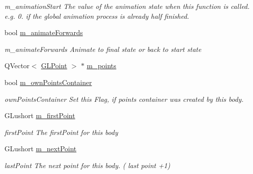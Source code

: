 \begin{DoxyCompactItemize}
\begin{DoxyCompactList}\small\item\em m\+\_\+animation\+Start The value of the animation state when this function is called. e.\+g. 0. if the global animation process is already half finished. \end{DoxyCompactList}\item 
\mbox{\label{class_g_l_body_ac3a56048c861a5bdd11b344e1e24946b}} 
bool \mbox{\hyperlink{class_g_l_body_ac3a56048c861a5bdd11b344e1e24946b}{m\+\_\+animate\+Forwards}}
\begin{DoxyCompactList}\small\item\em m\+\_\+animate\+Forwards Animate to final state or back to start state \end{DoxyCompactList}\item 
Q\+Vector$<$ \mbox{\hyperlink{class_g_l_point}{G\+L\+Point}} $>$ $\ast$ \mbox{\hyperlink{class_g_l_body_a8e157d4bf676d1c5af7f74d30d44ea12}{m\+\_\+points}}
\item 
\mbox{\label{class_g_l_body_afd41dccec396a5d5bc0d7deb004390c0}} 
bool \mbox{\hyperlink{class_g_l_body_afd41dccec396a5d5bc0d7deb004390c0}{m\+\_\+own\+Points\+Container}}
\begin{DoxyCompactList}\small\item\em own\+Points\+Container Set this Flag, if points container was created by this body. \end{DoxyCompactList}\item 
\mbox{\label{class_g_l_body_abaf51ac1970735fdc27e861e0276d059}} 
G\+Lushort \mbox{\hyperlink{class_g_l_body_abaf51ac1970735fdc27e861e0276d059}{m\+\_\+first\+Point}}
\begin{DoxyCompactList}\small\item\em first\+Point The first\+Point for this body \end{DoxyCompactList}\item 
\mbox{\label{class_g_l_body_ad23169cadd57fa23a035c50749974eaa}} 
G\+Lushort \mbox{\hyperlink{class_g_l_body_ad23169cadd57fa23a035c50749974eaa}{m\+\_\+next\+Point}}
\begin{DoxyCompactList}\small\item\em last\+Point The next point for this body. ( last point +1) \end{DoxyCompactList}\item 

\end{DoxyCompactItemize}
